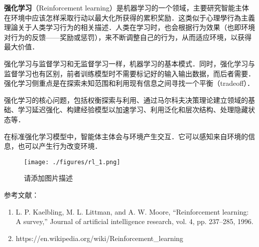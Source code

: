 
\textbf{强化学习}（Reinforcement learning）是机器学习的一个领域，主要研究智能主体在环境中应该怎样采取行动以最大化所获得的累积奖励．这类似于心理學行為主義理論关于人类学习行为的相关描述．人类在学习时，也会根据行为效果（也即环境对行为的反馈——奖励或惩罚），来不断调整自己的行为，从而适应环境，以获得最大价值．

强化学习与监督学习和无监督学习一样，机器学习的基本模式．同时，强化学习与监督学习也有区别，前者训练模型时不需要标记好的输入输出数据，而后者需要．强化学习侧重点是在探索未知范围和利用现有信息之间寻找一个平衡（tradeoff）．

强化学习的核心问题，包括权衡探索与利用、通过马尔科夫决策理论建立领域的基础、学习延迟强化、构建经验模型以加速学习、利用泛化和层次结构、处理隐藏状态等．

在标准强化学习模型中，智能体主体会与环境产生交互．它可以感知来自环境的信息，也可以产生行为改变环境．

\begin{figure}[ht]
\centering
\texttt{[image: ./figures/rl\_1.png]}
\caption{请添加图片描述} \label{rl_fig1}
\end{figure}


参考文献：
\begin{enumerate}
\item L. P. Kaelbling, M. L. Littman, and A. W. Moore, “Reinforcement learning: A survey,” Journal of artificial intelligence research, vol. 4, pp. 237–285, 1996.
\item https://en.wikipedia.org/wiki/Reinforcement_learning
\end{enumerate}
